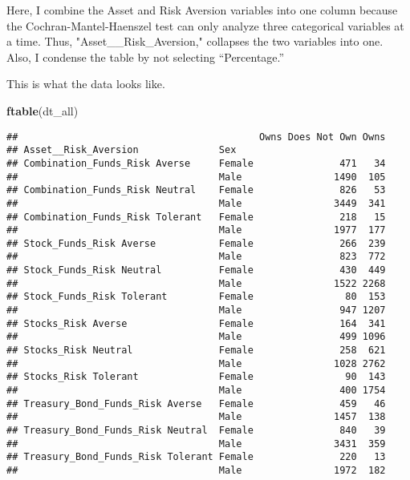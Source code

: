 \documentclass[
]{article}
\newenvironment{Shaded}{\begin{snugshade}}{\end{snugshade}}
\newcommand{\DataTypeTok}[1]{\textcolor[rgb]{0.13,0.29,0.53}{#1}}
\newcommand{\KeywordTok}[1]{\textcolor[rgb]{0.13,0.29,0.53}{\textbf{#1}}}
\newcommand{\NormalTok}[1]{#1}
\newcommand{\OperatorTok}[1]{\textcolor[rgb]{0.81,0.36,0.00}{\textbf{#1}}}
\newcommand{\StringTok}[1]{\textcolor[rgb]{0.31,0.60,0.02}{#1}}
\begin{document}
Here, I combine the Asset and Risk Aversion variables into one column
because the Cochran-Mantel-Haenszel test can only analyze three
categorical variables at a time. Thus, "Asset\_\_Risk\_Aversion,"
collapses the two variables into one. Also, I condense the table by not
selecting ``Percentage.''

\begin{Shaded}
\end{Shaded}

This is what the data looks like.

\begin{Shaded}
\begin{Highlighting}[]
\KeywordTok{ftable}\NormalTok{(dt_all)}
\end{Highlighting}
\end{Shaded}

\begin{verbatim}
##                                          Owns Does Not Own Owns
## Asset__Risk_Aversion              Sex                          
## Combination_Funds_Risk Averse     Female               471   34
##                                   Male                1490  105
## Combination_Funds_Risk Neutral    Female               826   53
##                                   Male                3449  341
## Combination_Funds_Risk Tolerant   Female               218   15
##                                   Male                1977  177
## Stock_Funds_Risk Averse           Female               266  239
##                                   Male                 823  772
## Stock_Funds_Risk Neutral          Female               430  449
##                                   Male                1522 2268
## Stock_Funds_Risk Tolerant         Female                80  153
##                                   Male                 947 1207
## Stocks_Risk Averse                Female               164  341
##                                   Male                 499 1096
## Stocks_Risk Neutral               Female               258  621
##                                   Male                1028 2762
## Stocks_Risk Tolerant              Female                90  143
##                                   Male                 400 1754
## Treasury_Bond_Funds_Risk Averse   Female               459   46
##                                   Male                1457  138
## Treasury_Bond_Funds_Risk Neutral  Female               840   39
##                                   Male                3431  359
## Treasury_Bond_Funds_Risk Tolerant Female               220   13
##                                   Male                1972  182
\end{verbatim}
\end{document}
